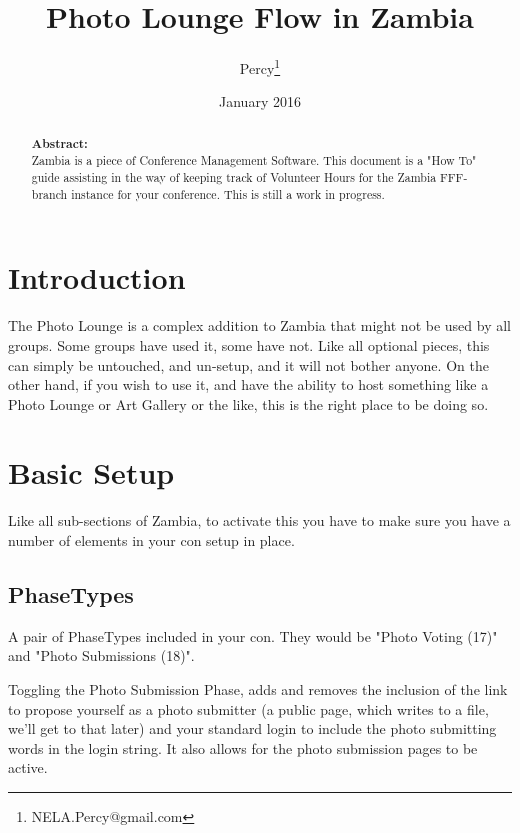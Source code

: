 \documentclass[captions=tablesignature]{scrartcl}
\author{Percy\thanks{NELA.Percy@gmail.com}}
\date{January 2016}
\title{Photo Lounge Flow in Zambia}
\begin{document}
\maketitle
{}
\thispagestyle{fancy}
\renewcommand{\headrulewidth}{0pt}
\renewcommand{\footrulewidth}{0pt}
\lhead{}
\rhead{}
\chead{}
\lfoot{}
\cfoot{}
\rfoot{}
\begin{abstract}
\vspace{5cm}
{\LARGE{\textbf{Abstract:\\}}}
Zambia is a piece of Conference Management Software.  This document is a "How To" guide assisting in the way of keeping track of Volunteer Hours for the Zambia FFF-branch instance for your conference.  This is still a work in progress.
\end{abstract}
\newpage
\renewcommand{\headrulewidth}{1pt}
\renewcommand{\footrulewidth}{1pt}
\rfoot{\thepage}
\setcounter{tocdepth}{3}
\tableofcontents
\newpage
{}
\section{Introduction}
\label{sec-1}

The Photo Lounge is a complex addition to Zambia that might not be
used by all groups.  Some groups have used it, some have not.  Like
all optional pieces, this can simply be untouched, and un-setup, and
it will not bother anyone.  On the other hand, if you wish to use
it, and have the ability to host something like a Photo Lounge or
Art Gallery or the like, this is the right place to be doing so.
\section{Basic Setup}
\label{sec-2}

Like all sub-sections of Zambia, to activate this you have to make
sure you have a number of elements in your con setup in place.
\subsection{PhaseTypes}
\label{sec-2-1}
A pair of PhaseTypes included in your con.  They would be "Photo
Voting (17)" and "Photo Submissions (18)".

Toggling the Photo Submission Phase, adds and removes the inclusion
of the link to propose yourself as a photo submitter (a public
page, which writes to a file, we'll get to that later) and your
standard login to include the photo submitting words in the login
string.  It also allows for the photo submission pages to be
active.
\end{document}
